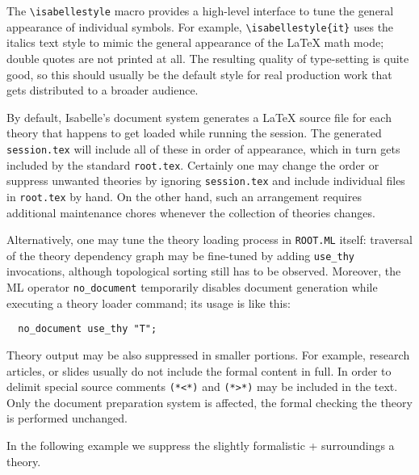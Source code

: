 \begin{isabellebody}
\begin{isamarkuptext}
  \medskip The \verb,\isabellestyle, macro provides a high-level
  interface to tune the general appearance of individual symbols.  For
  example, \verb,\isabellestyle{it}, uses the italics text style to
  mimic the general appearance of the {\LaTeX} math mode; double
  quotes are not printed at all.  The resulting quality of
  type-setting is quite good, so this should usually be the default
  style for real production work that gets distributed to a broader
  audience.%
\end{isamarkuptext}%
\isamarkuptrue%
%
\isamarkuptrue%
%
\begin{isamarkuptext}%
By default, Isabelle's document system generates a {\LaTeX} source
  file for each theory that happens to get loaded while running the
  session.  The generated \texttt{session.tex} will include all of
  these in order of appearance, which in turn gets included by the
  standard \texttt{root.tex}.  Certainly one may change the order or
  suppress unwanted theories by ignoring \texttt{session.tex} and
  include individual files in \texttt{root.tex} by hand.  On the other
  hand, such an arrangement requires additional maintenance chores
  whenever the collection of theories changes.

  Alternatively, one may tune the theory loading process in
  \texttt{ROOT.ML} itself: traversal of the theory dependency graph
  may be fine-tuned by adding \verb,use_thy, invocations, although
  topological sorting still has to be observed.  Moreover, the ML
  operator \verb,no_document, temporarily disables document generation
  while executing a theory loader command; its usage is like this:

\begin{verbatim}
  no_document use_thy "T";
\end{verbatim}

  \medskip Theory output may be also suppressed in smaller portions.
  For example, research articles, or slides usually do not include the
  formal content in full.  In order to delimit  special source comments
  \verb,(,\verb,*,\verb,<,\verb,*,\verb,), and
  \verb,(,\verb,*,\verb,>,\verb,*,\verb,), may be included in the
  text.  Only the document preparation system is affected, the formal
  checking the theory is performed unchanged.

  In the following example we suppress the slightly formalistic
   +  surroundings a theory.


\end{isamarkuptext}
\end{isabellebody}

